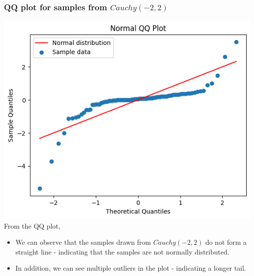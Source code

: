 \documentclass[12pt]{article}
\begin{document}
\subsubsection*{QQ plot for samples from \(Cauchy(-2, 2)\)}
\includegraphics[width=\linewidth]{graph1e}
From the QQ plot,
\begin{itemize}
    \item We can observe that the samples drawn from \(Cauchy(-2, 2)\) do not form
    a straight line - indicating that the samples are not normally distributed.
    \item In addition, we can see multiple outliers in the plot - indicating a
    longer tail.
\end{itemize}
\end{document}
